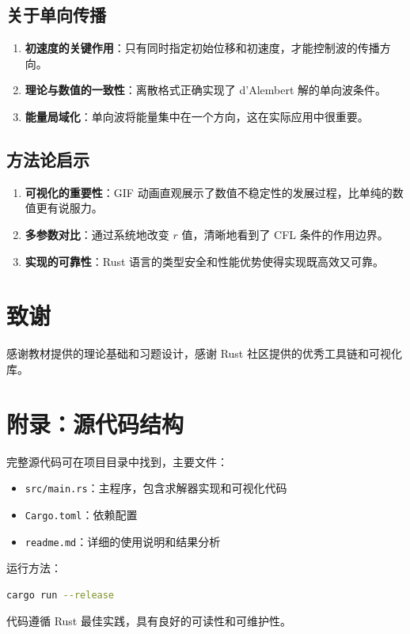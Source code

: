\documentclass[12pt,a4paper]{article}
\begin{document}
\subsection{关于单向传播}

\begin{enumerate}
    \item \textbf{初速度的关键作用}：只有同时指定初始位移和初速度，才能控制波的传播方向。
    
    \item \textbf{理论与数值的一致性}：离散格式正确实现了 d'Alembert 解的单向波条件。
    
    \item \textbf{能量局域化}：单向波将能量集中在一个方向，这在实际应用中很重要。
\end{enumerate}

\subsection{方法论启示}

\begin{enumerate}
    \item \textbf{可视化的重要性}：GIF 动画直观展示了数值不稳定性的发展过程，比单纯的数值更有说服力。
    
    \item \textbf{多参数对比}：通过系统地改变 $r$ 值，清晰地看到了 CFL 条件的作用边界。
    
    \item \textbf{实现的可靠性}：Rust 语言的类型安全和性能优势使得实现既高效又可靠。
\end{enumerate}

\section{致谢}

感谢教材提供的理论基础和习题设计，感谢 Rust 社区提供的优秀工具链和可视化库。

\section{附录：源代码结构}

完整源代码可在项目目录中找到，主要文件：

\begin{itemize}
    \item \texttt{src/main.rs}：主程序，包含求解器实现和可视化代码
    \item \texttt{Cargo.toml}：依赖配置
    \item \texttt{readme.md}：详细的使用说明和结果分析
\end{itemize}

运行方法：
\begin{lstlisting}[language=bash]
cargo run --release
\end{lstlisting}

代码遵循 Rust 最佳实践，具有良好的可读性和可维护性。
\end{document}
